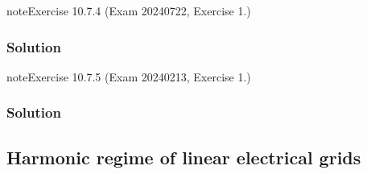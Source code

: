 \documentclass[letterpaper,10pt,italian]{jupyterBook}
\begin{document}
\begin{sphinxadmonition}{note}{Exercise 10.7.4 (Exam 2024\sphinxhyphen{}07\sphinxhyphen{}22, Exercise 1.)}



\begin{figure}[htbp]
\centering

\noindent{}
\end{figure}
\subsubsection*{Solution}
\end{sphinxadmonition}
 \label{exercise:exam-24-02-13-exe-01-b}

\begin{sphinxadmonition}{note}{Exercise 10.7.5 (Exam 2024\sphinxhyphen{}02\sphinxhyphen{}13, Exercise 1.)}



\begin{figure}[htbp]
\centering

\noindent{}
\end{figure}
\subsubsection*{Solution}
\end{sphinxadmonition}

\sphinxstepscope


\subsection{Harmonic regime of linear electrical grids}
\label{\detokenize{ch/electrical-engineering-exercises-harmonic:harmonic-regime-of-linear-electrical-grids}}\label{\detokenize{ch/electrical-engineering-exercises-harmonic:classical-electromagnetism-electrical-engineering-exercises-harmonic}}\label{\detokenize{ch/electrical-engineering-exercises-harmonic::doc}} \label{exercise:exam-25-02-11-exe-02}
\end{document}
